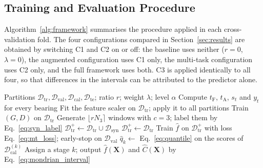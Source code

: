 \subsection{Training and Evaluation Procedure}
\label{sec:method_procedure}

Algorithm~\ref{alg:framework} summarises the procedure applied in each
cross-validation fold. The four configurations compared in
Section~\ref{sec:results} are obtained by switching C1 and C2 on or
off: the baseline uses neither ($r = 0$, $\lambda = 0$), the
augmented configuration uses C1 only, the multi-task configuration
uses C2 only, and the full framework uses both. C3 is applied
identically to all four, so that differences in the intervals can be
attributed to the predictor alone.

\begin{algorithm}[!htbp]
\caption{Per-fold procedure of the proposed framework.}
\label{alg:framework}
\begin{algorithmic}[1]
\Require Partitions $\mathcal{D}_{\mathrm{tr}}, \mathcal{D}_{\mathrm{val}},
         \mathcal{D}_{\mathrm{cal}}, \mathcal{D}_{\mathrm{te}}$;
         ratio $r$; weight $\lambda$; level $\alpha$
\State Compute $t_{\mathrm{F}}$, $t_{\mathrm{A}}$, $s_t$ and $y_t$ for
       every bearing 
\State Fit the feature scaler on $\mathcal{D}_{\mathrm{tr}}$; apply it to
       all partitions
 
  \State Train $(G, D)$ on $\mathcal{D}_{\mathrm{tr}}$
  \State Generate $\lfloor r N_3 \rceil$ windows with $c=3$; label them
         by Eq.~\eqref{eq:syn_label}
  \State $\mathcal{D}_{\mathrm{tr}}^{+} \gets \mathcal{D}_{\mathrm{tr}}
         \cup \mathcal{D}_{\mathrm{syn}}$
\Else
  \State $\mathcal{D}_{\mathrm{tr}}^{+} \gets \mathcal{D}_{\mathrm{tr}}$
\EndIf
\State Train $\hat{f}$ on $\mathcal{D}_{\mathrm{tr}}^{+}$ with loss
       Eq.~\eqref{eq:mt_loss}; early-stop on $\mathcal{D}_{\mathrm{val}}$
 
  \State $\hat{q}_k \gets$ Eq.~\eqref{eq:quantile} on the scores of
         $\mathcal{D}_{\mathrm{cal}}^{(k)}$
\EndFor
{}
  \State Assign a stage $k$; output $\hat{f}(\mathbf{X})$ and
         $\hat{C}(\mathbf{X})$ by Eq.~\eqref{eq:mondrian_interval}
\EndFor
\end{algorithmic}
\end{algorithm}

